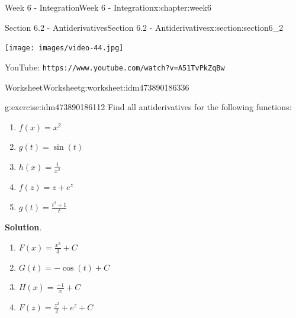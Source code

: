 \documentclass[oneside,10pt,]{book}
\newcommand{\blocktitlefont}{\relax}
\newcommand{\mono}[1]{\texttt{#1}}
\numberwithin{equation}{section}
\newlength{\qrsize}
\newlength{\previewwidth}
\begin{document}
\begin{chapterptx}{Week 6 - Integration}{}{Week 6 - Integration}{}{}{x:chapter:week6}
\begin{sectionptx}{Section 6.2 - Antiderivatives}{}{Section 6.2 - Antiderivatives}{}{}{x:section:section6_2}
\setlength{\qrsize}{9em}
\setlength{\previewwidth}{\linewidth}
\addtolength{\previewwidth}{-\qrsize}
\begin{tcbraster}[raster columns=2, raster column skip=1pt, raster halign=center, raster force size=false, raster left skip=0pt, raster right skip=0pt]%
\begin{tcolorbox}[previewstyle, width=\previewwidth]%
\texttt{[image: images/video-44.jpg]}%
\end{tcolorbox}%
\begin{tcolorbox}[qrstyle]%
{\hypersetup{urlcolor=black}}%
\end{tcolorbox}%
\begin{tcolorbox}[captionstyle]%
\small YouTube: \mono{https://www.youtube.com/watch?v=A51TvPkZqBw}\end{tcolorbox}%
\end{tcbraster}%
%
%
\typeout{************************************************}
\typeout{************************************************}
%
\begin{worksheet-subsection}{Worksheet}{}{Worksheet}{}{}{g:worksheet:idm473890186336}
\begin{divisionexercise}{1}{}{}{g:exercise:idm473890186112}%
Find all antiderivatives for the following functions:%
%
\begin{enumerate}[label=(\alph*)]
\item{}\(\displaystyle f(x)=x^2\)%
\item{}\(\displaystyle g(t)=\sin(t)\)%
\item{}\(\displaystyle h(x)=\frac{1}{x^2}\)%
\item{}\(\displaystyle f(z)= z+e^z\)%
\item{}\(\displaystyle g(t)=\frac{t^2+1}{t}\)%
\end{enumerate}
\textbf{\blocktitlefont Solution}.\hypertarget{g:solution:idm473890183216}{}\quad{}%
\begin{enumerate}[label=(\alph*)]
\item{}\(\displaystyle F(x)=\frac{x^3}{3}+C\)%
\item{}\(\displaystyle G(t)=-\cos(t)+C\)%
\item{}\(\displaystyle H(x)=\frac{-1}{x}+C\)%
\item{}\(\displaystyle F(z)= \frac{z^2}{2}+e^z+C\)%

\end{enumerate}
\end{divisionexercise}
\end{worksheet-subsection}
\end{sectionptx}
\end{chapterptx}
\end{document}
